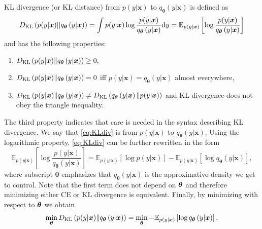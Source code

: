 KL divergence (or KL distance) from $p(y| \boldsymbol{x})$ to $q_{\boldsymbol{\theta}}\left(y|\boldsymbol{x}\right)$ is defined as
\begin{equation}\label{eq:KLdiv}
D_{\mathrm{KL}} \left(p(y| \boldsymbol{x}) || q_{\boldsymbol{\theta}}\left(y|\boldsymbol{x}\right) \right) = \int p(y| \boldsymbol{x})\log\frac{p(y| \boldsymbol{x})}{q_{\boldsymbol{\theta}}\left(y|\boldsymbol{x}\right)}\mathrm{d}{y} = \mathbb{E}_{p(y| \boldsymbol{x})} \left[\log\frac{p(y| \boldsymbol{x})}{q_{\boldsymbol{\theta}}\left(y|\boldsymbol{x}\right)} \right]
\end{equation}
and has the following properties:
\begin{enumerate}
\item $D_{\mathrm{KL}} \left(p(y| \boldsymbol{x}) \Vert q_{\boldsymbol{\theta}}\left(y|\boldsymbol{x}\right) \right) \geq 0,$
\item $D_{\mathrm{KL}} \left(p(y| \boldsymbol{x}) \Vert q_{\boldsymbol{\theta}}\left(y|\boldsymbol{x}\right) \right) = 0$ iff $p(y| \boldsymbol{x}) = q_{\boldsymbol{\theta}}\left(y|\boldsymbol{x}\right)$ almost everywhere,
\item $D_{\mathrm{KL}} \left(p(y| \boldsymbol{x}) \Vert q_{\boldsymbol{\theta}}\left(y|\boldsymbol{x}\right) \right) \neq D_{\mathrm{KL}} \left(q_{\boldsymbol{\theta}}\left(y|\boldsymbol{x}\right) \Vert p(y| \boldsymbol{x}) \right)$ and KL divergence does not obey the triangle inequality.
\end{enumerate}
The third property indicates that care is needed in the syntax describing KL divergence. We say that \eqref{eq:KLdiv} is from $p(y| \boldsymbol{x})$ to $q_{\boldsymbol{\theta}}\left(y|\boldsymbol{x}\right)$. Using the logarithmic property, \eqref{eq:KLdiv} can be further rewritten in the form 
\begin{equation}
	 \mathbb{E}_{p(y| \boldsymbol{x})} \left[\log\frac{p(y| \boldsymbol{x})}{q_{\boldsymbol{\theta}}\left(y|\boldsymbol{x}\right)} \right] = 
	 \mathbb{E}_{p(y| \boldsymbol{x})} \left[\log p(y| \boldsymbol{x}) \right] - \mathbb{E}_{p(y| \boldsymbol{x})} \left[\log q_{\boldsymbol{\theta}}\left(y|\boldsymbol{x}\right) \right],
	\end{equation}
where subscript $\boldsymbol{\theta}$ emphasizes that $q_{\boldsymbol{\theta}}\left(y|\boldsymbol{x}\right)$ is the approximative density we get to control. Note that
the first term does not depend on $\boldsymbol{\theta}$ and therefore minimizing either CE or KL divergence is equivalent. Finally, by minimizing with respect to $\boldsymbol{\theta}$ we obtain
\begin{equation}
\min_{\boldsymbol{\theta}} D_{\mathrm{KL}} \left(p(y| \boldsymbol{x}) \Vert q_{\boldsymbol{\theta}}\left(y|\boldsymbol{x}\right) \right) = \min_{\boldsymbol{\theta}} - \mathbb{E}_{p(y| \boldsymbol{x})}\left[ \log q_{\boldsymbol{\theta}}\left(y|\boldsymbol{x}\right)\right].
\end{equation}
